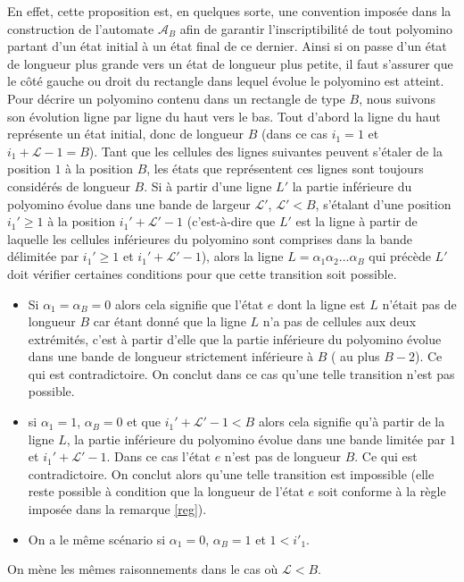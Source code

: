 \begin{Pre}
En effet, cette proposition est, en quelques sorte, une convention imposée dans la construction de l'automate $\mathcal{A}_{B}$ afin de garantir l'inscriptibilité de tout polyomino  partant d'un état initial à un état final de ce dernier. Ainsi si on passe d'un état de longueur plus grande vers un état de longueur plus petite, il faut s'assurer que le  côté gauche ou droit du rectangle dans lequel évolue le polyomino est atteint. Pour décrire un polyomino contenu dans un rectangle de type $B$, nous suivons son évolution ligne par ligne du haut vers le bas. Tout d'abord la ligne du haut représente un état initial, donc de longueur $B$ (dans ce cas $i_{1}=1$ et $i_{1} +\mathcal{L}-1=B$). Tant que les cellules des lignes suivantes peuvent s'étaler de la position $1$ à la position $B$, les états que représentent ces lignes sont toujours considérés de longueur $B$. Si à partir d'une ligne $L'$ la partie inférieure du polyomino évolue dans une bande de largeur $\mathcal{L}'$, $\mathcal{L}'<B$, s'étalant d'une position $i_{1}'\geq 1$  à  la position $i_{1}'+\mathcal{L}'-1$ (c'est-à-dire que $L'$ est la ligne à partir de laquelle les cellules inférieures du polyomino sont comprises dans la bande délimitée par $i_{1}'\geq 1$  et $i_{1}'+\mathcal{L}'-1$), alors la ligne $L=\alpha_{1}\alpha_{2}...\alpha_{B}$ qui précède $L'$ doit vérifier certaines conditions pour que cette transition soit possible.
\begin{itemize}
\item Si $\alpha_{1}=\alpha_{B}=0$ alors cela signifie que l'état $e$ dont la ligne est $L$ n'était pas de longueur $B$ car étant donné que la ligne $L$ n'a pas de cellules aux deux extrémités, c'est à partir d'elle que la partie inférieure du polyomino évolue dans une bande de longueur strictement inférieure à $B$ ( au plus $B-2$). Ce qui est contradictoire.  On conclut dans ce cas qu'une telle transition n'est pas possible.
\item si  $\alpha_{1}=1 $, $\alpha_{B}=0$ et que $i_{1}'+\mathcal{L}'-1<B$ alors cela signifie qu'à partir de la ligne $L$, la partie inférieure du polyomino évolue dans une bande limitée par $1$ et $i_{1}'+\mathcal{L}'-1$. Dans ce cas l'état $e$ n'est pas de longueur $B$. Ce qui est contradictoire. On conclut alors qu'une telle transition est impossible (elle reste possible à condition que la longueur de l'état $e$ soit conforme à la règle imposée dans la remarque \ref{reg}).
\item On a le même scénario si $\alpha_{1}=0$, $\alpha_{B}=1$ et  $1 < i'_{1} $.
\end{itemize}
On mène les mêmes raisonnements dans le cas où $\mathcal{L}<B$.
\end{Pre}
